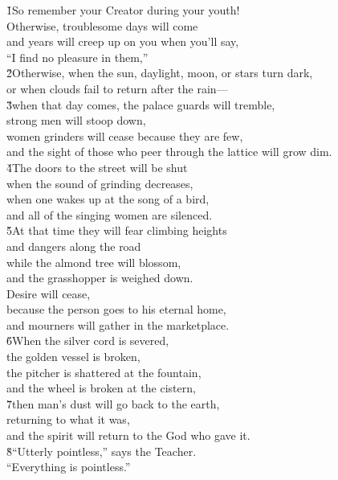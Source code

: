 \begin{poetry}
\poeml {}
\v{1}So remember your Creator during your youth! \\
\poeml Otherwise, troublesome days will come \\
\poeml and years will creep up on you when you'll say, \\
\poemlll       ``I find no pleasure in them,'' \\
\poeml \v{2}Otherwise, when the sun, daylight, moon, or stars turn dark, \\
\poemll    or when clouds fail to return after the rain--- \\
\poeml \v{3}when that day comes, the palace guards will tremble, \\
\poemll    strong men will stoop down, \\
\poeml women grinders will cease because they are few, \\
\poemll    and the sight of those who peer through the lattice will grow dim. \\
\poeml \v{4}The doors to the street will be shut \\
\poemll    when the sound of grinding decreases, \\
\poeml when one wakes up at the song of a bird, \\
\poemll    and all of the singing women are silenced. \\
\poeml \v{5}At that time they will fear climbing heights \\
\poemll    and dangers along the road \\
\poeml while the almond tree will blossom, \\
\poemll    and the grasshopper is weighed down. \\
\poeml Desire will cease, \\
\poemll    because the person goes to his eternal home, \\
\poemlll       and mourners will gather in the marketplace. \\
\poeml \v{6}When the silver cord is severed, \\
\poemll    the golden vessel is broken, \\
\poeml the pitcher is shattered at the fountain, \\
\poemll    and the wheel is broken at the cistern, \\
\poeml \v{7}then man's dust will go back to the earth, \\
\poemll    returning to what it was, \\
\poemlll       and the spirit will return to the God who gave it. \\
\poeml \v{8}``Utterly pointless,'' says the Teacher. \\
\poemll    ``Everything is pointless.''
\end{poetry}

